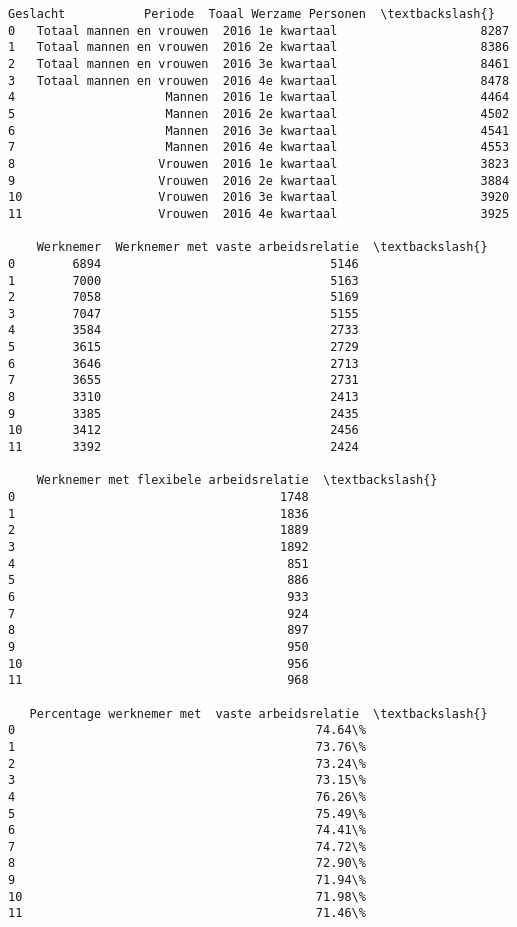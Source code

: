 \documentclass[11pt]{article}
\begin{document}
    \begin{Verbatim}[commandchars=\\\{\}]
                    Geslacht           Periode  Toaal Werzame Personen  \textbackslash{}
0   Totaal mannen en vrouwen  2016 1e kwartaal                    8287   
1   Totaal mannen en vrouwen  2016 2e kwartaal                    8386   
2   Totaal mannen en vrouwen  2016 3e kwartaal                    8461   
3   Totaal mannen en vrouwen  2016 4e kwartaal                    8478   
4                     Mannen  2016 1e kwartaal                    4464   
5                     Mannen  2016 2e kwartaal                    4502   
6                     Mannen  2016 3e kwartaal                    4541   
7                     Mannen  2016 4e kwartaal                    4553   
8                    Vrouwen  2016 1e kwartaal                    3823   
9                    Vrouwen  2016 2e kwartaal                    3884   
10                   Vrouwen  2016 3e kwartaal                    3920   
11                   Vrouwen  2016 4e kwartaal                    3925   

    Werknemer  Werknemer met vaste arbeidsrelatie  \textbackslash{}
0        6894                                5146   
1        7000                                5163   
2        7058                                5169   
3        7047                                5155   
4        3584                                2733   
5        3615                                2729   
6        3646                                2713   
7        3655                                2731   
8        3310                                2413   
9        3385                                2435   
10       3412                                2456   
11       3392                                2424   

    Werknemer met flexibele arbeidsrelatie  \textbackslash{}
0                                     1748   
1                                     1836   
2                                     1889   
3                                     1892   
4                                      851   
5                                      886   
6                                      933   
7                                      924   
8                                      897   
9                                      950   
10                                     956   
11                                     968   

   Percentage werknemer met  vaste arbeidsrelatie  \textbackslash{}
0                                          74.64\%   
1                                          73.76\%   
2                                          73.24\%   
3                                          73.15\%   
4                                          76.26\%   
5                                          75.49\%   
6                                          74.41\%   
7                                          74.72\%   
8                                          72.90\%   
9                                          71.94\%   
10                                         71.98\%   
11                                         71.46\%   


\end{Verbatim}
\end{document}
